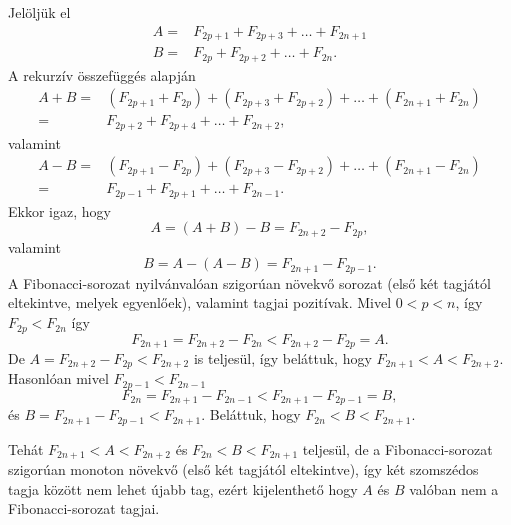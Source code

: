 \begin{solution}
Jelöljük el 
\[
\begin{aligned}A= & F_{2p+1}+F_{2p+3}+\ldots+F_{2n+1}\\
B= & F_{2p}+F_{2p+2}+\ldots+F_{2n}.
\end{aligned}
\]
A rekurzív összefüggés alapján 
\[
\begin{aligned}A+B= & (F_{2p+1}+F_{2p})+(F_{2p+3}+F_{2p+2})+\ldots+(F_{2n+1}+F_{2n})\\
= & F_{2p+2}+F_{2p+4}+\ldots+F_{2n+2},
\end{aligned}
\]
valamint 
\[
\begin{aligned}A-B= & (F_{2p+1}-F_{2p})+(F_{2p+3}-F_{2p+2})+\ldots+(F_{2n+1}-F_{2n})\\
= & F_{2p-1}+F_{2p+1}+\ldots+F_{2n-1}.
\end{aligned}
\]
Ekkor igaz, hogy 
\[
A=(A+B)-B=F_{2n+2}-F_{2p},
\]
valamint 
\[
B=A-(A-B)=F_{2n+1}-F_{2p-1}.
\]
A Fibonacci-sorozat nyilvánvalóan szigorúan növekvő sorozat (első
két tagjától eltekintve, melyek egyenlőek), valamint tagjai pozitívak.
Mivel $0<p<n$, így $F_{2p}<F_{2n}$ így 
\[
F_{2n+1}=F_{2n+2}-F_{2n}<F_{2n+2}-F_{2p}=A.
\]
De $A=F_{2n+2}-F_{2p}<F_{2n+2}$ is teljesül, így beláttuk, hogy $F_{2n+1}<A<F_{2n+2}$.\\
 Hasonlóan mivel $F_{2p-1}<F_{2n-1}$ 
\[
F_{2n}=F_{2n+1}-F_{2n-1}<F_{2n+1}-F_{2p-1}=B,
\]
és $B=F_{2n+1}-F_{2p-1}<F_{2n+1}$. Beláttuk, hogy $F_{2n}<B<F_{2n+1}$.

Tehát $F_{2n+1}<A<F_{2n+2}$ és $F_{2n}<B<F_{2n+1}$ teljesül, de
a Fibonacci-sorozat szigorúan monoton növekvő (első két tagjától eltekintve),
így két szomszédos tagja között nem lehet újabb tag, ezért kijelenthető
hogy $A$ és $B$ valóban nem a Fibonacci-sorozat tagjai.
\end{solution}
